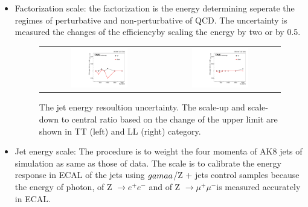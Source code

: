 \begin{itemize}
	\item Factorization scale: the factorization is the energy determining seperate the regimes of perturbative and non-perturbative of QCD. The uncertainty is measured the changes of the efficiencyby scaling the energy by two or by 0.5.
  
  \begin{figure}[t]
  \centering
 \begin{tabular}{cc}
    \includegraphics[width=0.5\textwidth]{Figures/plots_uncert/JER_TT.pdf} &
   \includegraphics[width=0.5\textwidth]{Figures/plots_uncert/JER_LL.pdf} \\
  \end{tabular}
  \caption{The jet energy resoultion uncertainty. The scale-up and scale-down to central ratio based on the change of the upper limit are shown in TT (left) and LL (right) category.}
  \label{fig:hvt_brs}
\end{figure}  
  \item Jet energy scale: The procedure is to weight the four momenta of AK8 jets of simulation as same as those of data\citep{Chatrchyan:2011ds}. The scale is to calibrate the energy response in ECAL of the jets using $\\gamaa$/Z + jets control samples because the energy of photon, of Z $\rightarrow e^+e^-$ and of Z $\rightarrow \mu^+\mu^-$is measured accurately in ECAL.
  

\end{itemize}
